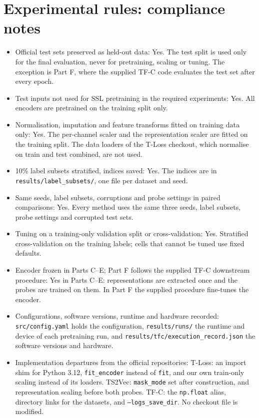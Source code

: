 \documentclass[a4paper,11pt]{article}
\newcommand{\code}[1]{\texttt{#1}}
\begin{document}
\section{Experimental rules: compliance notes}
\begin{itemize}
    \item Official test sets preserved as held-out data: Yes. The test split is used only for the final evaluation, never for pretraining, scaling or tuning. The exception is Part F, where the supplied TF-C code evaluates the test set after every epoch.
    \item Test inputs not used for SSL pretraining in the required experiments: Yes. All encoders are pretrained on the training split only.
    \item Normalisation, imputation and feature transforms fitted on training data only: Yes. The per-channel scaler and the representation scaler are fitted on the training split. The data loaders of the T-Loss checkout, which normalise on train and test combined, are not used.
    \item 10\% label subsets stratified, indices saved: Yes. The indices are in \code{results/label\_subsets/}, one file per dataset and seed.
    \item Same seeds, label subsets, corruptions and probe settings in paired comparisons: Yes. Every method uses the same three seeds, label subsets, probe settings and corrupted test sets.
    \item Tuning on a training-only validation split or cross-validation: Yes. Stratified cross-validation on the training labels; cells that cannot be tuned use fixed defaults.
    \item Encoder frozen in Parts C--E; Part F follows the supplied TF-C downstream procedure: Yes in Parts C--E: representations are extracted once and the probes are trained on them. In Part F the supplied procedure fine-tunes the encoder.
    \item Configurations, software versions, runtime and hardware recorded: \code{src/config.yaml} holds the configuration, \code{results/runs/} the runtime and device of each pretraining run, and \code{results/tfc/execution\_record.json} the software versions and hardware.
    \item Implementation departures from the official repositories: T-Loss: an import shim for Python 3.12, \code{fit\_encoder} instead of \code{fit}, and our own train-only scaling instead of its loaders. TS2Vec: \code{mask\_mode} set after construction, and representation scaling before both probes. TF-C: the \code{np.float} alias, directory links for the datasets, and \code{--logs\_save\_dir}. No checkout file is modified.
\end{itemize}
\end{document}
